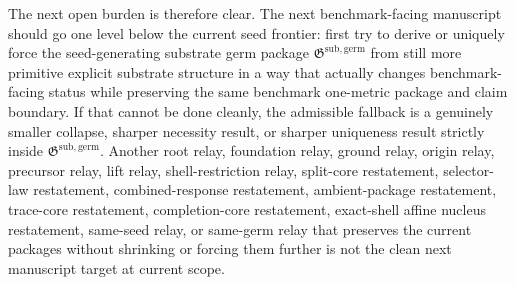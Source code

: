 \documentclass[11pt]{article}
\newcommand{\GermPackage}{\mathfrak G^{\mathrm{sub,germ}}}
\begin{document}
The next open burden is therefore clear. The next benchmark-facing manuscript should go one level below the current seed frontier: first try to derive or uniquely force the seed-generating substrate germ package \(\GermPackage\) from still more primitive explicit substrate structure in a way that actually changes benchmark-facing status while preserving the same benchmark one-metric package and claim boundary. If that cannot be done cleanly, the admissible fallback is a genuinely smaller collapse, sharper necessity result, or sharper uniqueness result strictly inside \(\GermPackage\). Another root relay, foundation relay, ground relay, origin relay, precursor relay, lift relay, shell-restriction relay, split-core restatement, selector-law restatement, combined-response restatement, ambient-package restatement, trace-core restatement, completion-core restatement, exact-shell affine nucleus restatement, same-seed relay, or same-germ relay that preserves the current packages without shrinking or forcing them further is not the clean next manuscript target at current scope.
\end{document}
